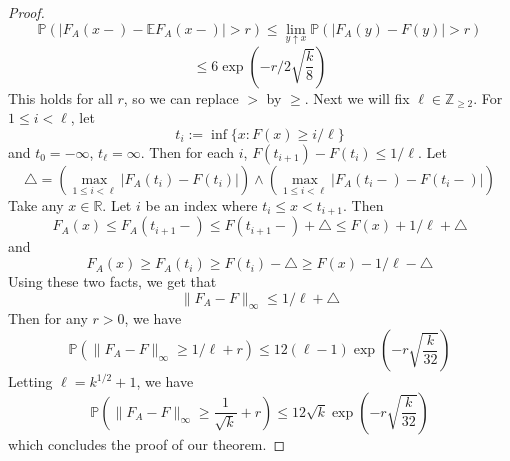 \documentclass[12pt]{report}
\theoremstyle{definition}
\begin{document}
\begin{proof}
\begin{equation*}
\mathbb{P}(|F_A(x-)-\mathbb{E}F_A(x-)|>r)\leq \lim_{y\uparrow x}\mathbb{P}(|F_A(y)-F(y)|>r)
\end{equation*}
\begin{equation*}
\leq 6\exp\left(-r/2\sqrt{\frac{k}{8}}\right)
\end{equation*}
This holds for all $r$, so we can replace $>$ by $\geq$.  Next we will fix $\ell\in\mathbb{Z}_{\geq 2}$.  For $1\leq i<\ell$, let
\begin{equation*}
t_i:=\inf\{x:F(x)\geq i/\ell\}
\end{equation*}
and $t_0=-\infty$, $t_\ell=\infty$.  Then for each $i$, $F(t_{i+1})-F(t_i)\leq 1/\ell$.  Let
$$
\triangle=(\max_{1\leq i<\ell}|F_A(t_i)-F(t_i)|)\wedge (\max_{1\leq i<\ell}|F_A(t_i-)-F(t_i-)|)
$$
Take any $x\in\mathbb{R}$.  Let $i$ be an index where $t_i\leq x<t_{i+1}$.  Then 
\begin{equation*}
F_A(x)\leq F_A(t_{i+1}-)\leq F(t_{i+1}-)+\triangle\leq F(x)+1/\ell +\triangle 
\end{equation*}
and 
\begin{equation*}
F_A(x)\geq F_A(t_i)\geq F(t_i)-\triangle\geq F(x)-1/\ell-\triangle
\end{equation*}
Using these two facts, we get that 
\begin{equation*}
\|F_A-F\|_{\infty}\leq 1/\ell+\triangle
\end{equation*}
Then for any $r>0$, we have 
\begin{equation*}
\mathbb{P}(\|F_A-F\|_{\infty}\geq 1/\ell+r)\leq 12(\ell-1)\exp\left(-r\sqrt{\frac{k}{32}}\right)
\end{equation*}
Letting $\ell=k^{1/2}+1$, we have
\begin{equation*}
\mathbb{P}(\|F_A-F\|_{\infty}\geq \frac{1}{\sqrt{k}}+r)\leq 12\sqrt{k}\exp\left(-r\sqrt{\frac{k}{32}}\right)
\end{equation*} which concludes the proof of our theorem.  
\end{proof}
 
\end{document}
